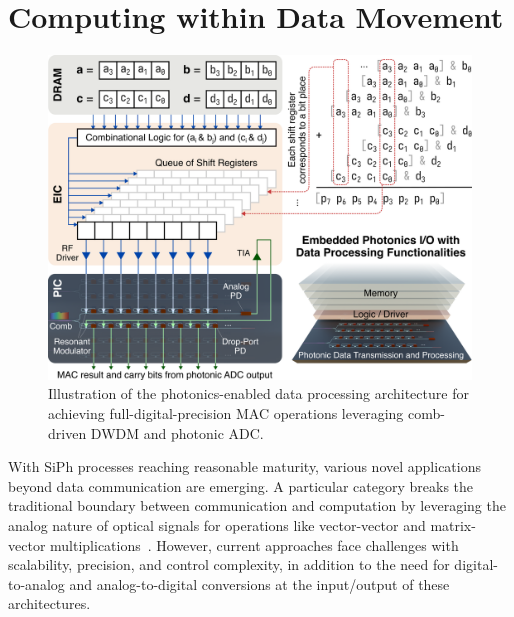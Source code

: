 \section*{Computing within Data Movement}

\begin{figure}
    \vspace{-5em}
    \begin{center}
        \includegraphics[width=\linewidth]{../../6_figures/rs_fig_3_comppho.png}
    \end{center}
    \caption{Illustration of the photonics-enabled data processing architecture for achieving full-digital-precision MAC operations leveraging comb-driven DWDM and photonic ADC.}
    \label{fig:pho_computing}
\end{figure}

With SiPh processes reaching reasonable maturity, various novel applications beyond data communication are emerging. A particular category breaks the traditional boundary between communication and computation by leveraging the analog nature of optical signals for operations like vector-vector and matrix-vector multiplications~\cite{taitMicroringWeightBanks2016,shenDeepLearningCoherent2017}. However, current approaches face challenges with scalability, precision, and control complexity, in addition to the need for digital-to-analog and analog-to-digital conversions at the input/output of these architectures.

